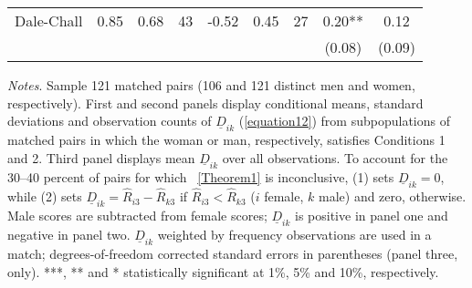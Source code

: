 \begin{table}[H]
\begin{threeparttable}
\begin{tabular}{p{3cm}S[table-format=3.3]@{}S[table-format=3.3]@{}S[table-format=3.2]@{}S[table-format=4.3]@{}S[table-format=3.3]@{}S[table-format=3.1]@{}S@{}S@{}}
            Dale-Chall                    &        0.85&        0.68&          43&       -0.52&        0.45&          27&        0.20** &        0.12   \\
                                          &            &            &            &            &            &            &      (0.08)   &      (0.09)   \\
            \bottomrule
        \end{tabular}
        \begin{tablenotes}
            \tiny
            \item \textit{Notes}. Sample 121 matched pairs (106 and 121 distinct men and women, respectively). First and second panels display conditional means, standard deviations and observation counts of \(\underline D_{ik}\) (\autoref{equation12}) from subpopulations of matched pairs in which the woman or man, respectively, satisfies Conditions 1 and 2. Third panel displays mean \(\underline D_{ik}\) over all observations. To account for the 30--40 percent of pairs for which ~\autoref{Theorem1} is inconclusive, (1) sets \(\underline D_{ik}=0\), while (2) sets \(\underline D_{ik}=\widehat R_{i3}-\widehat R_{k3}\) if \(\widehat R_{i3}<\widehat R_{k3}\) (\(i\) female, \(k\) male) and zero, otherwise. Male scores are subtracted from female scores; \(\underline D_{ik}\) is positive in panel one and negative in panel two. \(\underline D_{ik}\) weighted by frequency observations are used in a match; degrees-of-freedom corrected standard errors in parentheses (panel three, only). ***, ** and * statistically significant at 1\%, 5\% and 10\%, respectively.
        \end{tablenotes}
    \end{threeparttable}
\end{table}